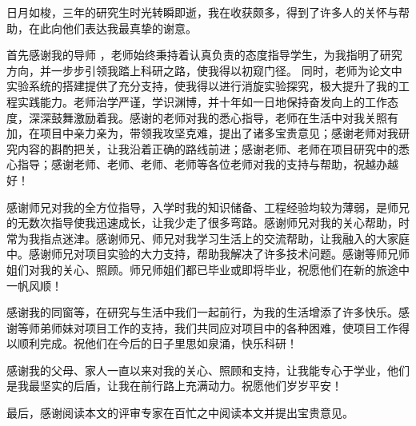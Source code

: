 \documentclass[lang=chs, degree=master, blindreview=false, winfonts=true]{yanputhesis}
\begin{document}
\begin{acknowledgements}                                    %
日月如梭，三年的研究生时光转瞬即逝，我在收获颇多，得到了许多人的关怀与帮助，在此向他们表达我最真挚的谢意。

首先感谢我的导师 ，老师始终秉持着认真负责的态度指导学生，为我指明了研究方向，并一步步引领我踏上科研之路，使我得以初窥门径。 同时，老师为论文中实验系统的搭建提供了充分支持，使我得以进行消旋实验探究，极大提升了我的工程实践能力。老师治学严谨，学识渊博，并十年如一日地保持奋发向上的工作态度，深深鼓舞激励着我。感谢的老师对我的悉心指导，老师在生活中对我关照有加，在项目中亲力亲为，带领我攻坚克难，提出了诸多宝贵意见；感谢老师对我研究内容的斟酌把关，让我沿着正确的路线前进；感谢老师、老师在项目研究中的悉心指导；感谢老师、老师、老师、老师等各位老师对我的支持与帮助，祝越办越好！

感谢师兄对我的全方位指导，入学时我的知识储备、工程经验均较为薄弱，是师兄的无数次指导使我迅速成长，让我少走了很多弯路。感谢师兄对我的关心帮助，时常为我指点迷津。感谢师兄、师兄对我学习生活上的交流帮助，让我融入的大家庭中。感谢师兄对项目实验的大力支持，帮助我解决了许多技术问题。感谢等师兄师姐们对我的关心、照顾。师兄师姐们都已毕业或即将毕业，祝愿他们在新的旅途中一帆风顺！

感谢我的同窗等，在研究与生活中我们一起前行，为我的生活增添了许多快乐。感谢等师弟师妹对项目工作的支持，我们共同应对项目中的各种困难，使项目工作得以顺利完成。祝他们在今后的日子里思如泉涌，快乐科研！
    
感谢我的父母、家人一直以来对我的关心、照顾和支持，让我能专心于学业，他们是我最坚实的后盾，让我在前行路上充满动力。祝愿他们岁岁平安！

最后，感谢阅读本文的评审专家在百忙之中阅读本文并提出宝贵意见。
\end{acknowledgements}                                      %
\end{document}
